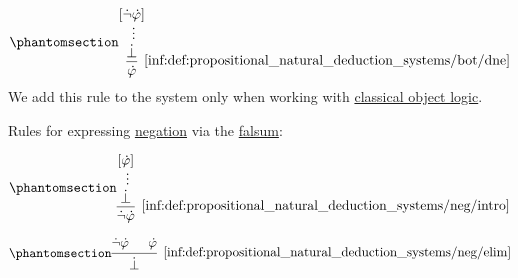 \begin{definition}
\begin{thmenum}
\begin{paracol}{2}
      \begin{rightcolumn}
        \begin{equation*}\taglabel[\logic{DNE}]{inf:def:propositional_natural_deduction_systems/bot/dne}
          \begin{prooftree}
            \hypo{ [\synneg \syn\varphi] }
            \ellipsis {} { \synbot }
            \infer1[\ref{inf:def:propositional_natural_deduction_systems/bot/dne}]{ \syn\varphi }
          \end{prooftree}
        \end{equation*}
        We add this rule to the system only when working with \hyperref[con:classical_logic]{classical object logic}.
      \end{rightcolumn}
    \end{paracol}

     Rules for expressing \hyperref[def:propositional_alphabet/negation]{negation} via the \hyperref[def:propositional_alphabet/constants/falsum]{falsum}:
    \begin{paracol}{2}
      \begin{leftcolumn}
        \begin{equation*}\taglabel[\ensuremath{ \neg^+ }]{inf:def:propositional_natural_deduction_systems/neg/intro}
          \begin{prooftree}
            \hypo{ [\syn\varphi] }
            \ellipsis {} { \synbot }
            \infer1[\ref{inf:def:propositional_natural_deduction_systems/neg/intro}]{ \synneg \syn\varphi }
          \end{prooftree}
        \end{equation*}
      \end{leftcolumn}

      \begin{rightcolumn}
        \begin{equation*}\taglabel[\ensuremath{ \neg^- }]{inf:def:propositional_natural_deduction_systems/neg/elim}
          \begin{prooftree}
            \hypo{ \synneg \syn\varphi }
            \hypo{ \syn\varphi }
            \infer2[\ref{inf:def:propositional_natural_deduction_systems/neg/elim}]{ \synbot }
          \end{prooftree}
        \end{equation*}
      \end{rightcolumn}
    \end{paracol}


\end{thmenum}
\end{definition}
